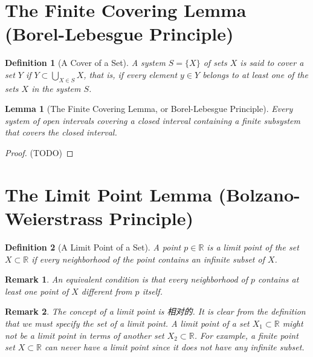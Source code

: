 \documentclass[onecolumn]{ctexart}
\newtheorem{definition}{Definition}
\newtheorem{lemma}{Lemma}
\newtheorem{remark}{Remark}
\begin{document}
\section{The Finite Covering Lemma (Borel-Lebesgue Principle)}

\begin{definition}[A Cover of a Set]
  A system $S = \lbrace X \rbrace$ of sets $X$ is said to cover a set $Y$ if $Y 
  \subset \bigcup_{X \in S} X$, that is, if every element $y \in Y$ belongs to 
  at least one of the sets $X$ in the system $S$.
\end{definition}

\begin{lemma}[The Finite Covering Lemma, or Borel-Lebesgue Principle]
  Every system of open intervals covering a closed interval containing a finite 
  subsystem that covers the closed interval.
\end{lemma}
\begin{proof}
  (TODO)
\end{proof}

\section{The Limit Point Lemma (Bolzano-Weierstrass Principle)}

\begin{definition}[A Limit Point of a Set]
  A point $p \in \mathbb{R}$ is a limit point of the set $X \subset \mathbb{R}$ 
  if every neighborhood of the point contains an infinite subset of $X$.
\end{definition}
\begin{remark}
  An equivalent condition is that every neighborhood of $p$ contains at least 
  one point of $X$ different from $p$ itself.
\end{remark}
\begin{remark}
  The concept of a limit point is 相对的. It is clear from the definition that we 
  must specify the set of a limit point. A limit point of a set $X_1 \subset 
  \mathbb{R}$ might not be a limit point in terms of another set $X_2 \subset 
  \mathbb{R}$. For example, a finite point set $X \subset \mathbb{R}$ can never 
  have a limit point since it does not have any infinite subset.
\end{remark}
\end{document}
